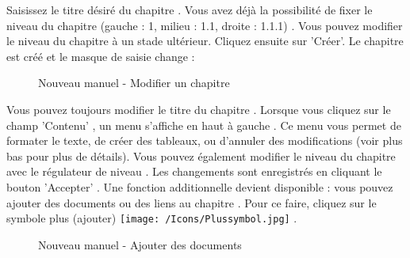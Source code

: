 Saisissez le titre désiré du chapitre . Vous avez déjà la possibilité de fixer le niveau du chapitre (gauche : 1, milieu : 1.1, droite : 1.1.1) . Vous pouvez modifier le niveau du chapitre à un stade ultérieur. Cliquez ensuite sur 'Créer'. Le chapitre est créé et le masque de saisie change :

\begin{figure}[H]
\caption{Nouveau manuel - Modifier un chapitre}
\end{figure}

Vous pouvez toujours modifier le titre du chapitre . Lorsque vous cliquez sur le champ 'Contenu' , un menu s'affiche en haut à gauche . Ce menu vous permet de formater le texte, de créer des tableaux, ou d'annuler des modifications (voir plus bas pour plus de détails). Vous pouvez également modifier le niveau du chapitre avec le régulateur de niveau . Les changements sont enregistrés en cliquant le bouton 'Accepter' . Une fonction additionnelle devient disponible : vous pouvez ajouter des documents ou des liens au chapitre . Pour ce faire, cliquez sur le symbole plus (ajouter) \texttt{[image: /Icons/Plussymbol.jpg]} .

\begin{figure}[H]
\caption{Nouveau manuel - Ajouter des documents}
\end{figure}

